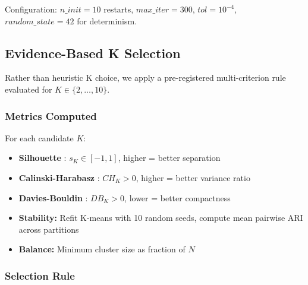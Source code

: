 Configuration: $n\_init=10$ restarts, $max\_iter=300$, $tol=10^{-4}$, $random\_state=42$ for determinism.

\subsection{Evidence-Based K Selection}
\label{sec:kselection}

Rather than heuristic K choice, we apply a pre-registered multi-criterion rule evaluated for $K \in \{2, \ldots, 10\}$.

\subsubsection{Metrics Computed}

For each candidate $K$:
\begin{itemize}
    \item \textbf{Silhouette} \cite{rousseeuw1987silhouettes}: $s_K \in [-1, 1]$, higher = better separation
    \item \textbf{Calinski-Harabasz} \cite{calinski1974dendrite}: $CH_K > 0$, higher = better variance ratio
    \item \textbf{Davies-Bouldin} \cite{davies1979cluster}: $DB_K > 0$, lower = better compactness
    \item \textbf{Stability:} Refit K-means with 10 random seeds, compute mean pairwise ARI across partitions
    \item \textbf{Balance:} Minimum cluster size as fraction of $N$
\end{itemize}

\subsubsection{Selection Rule}

